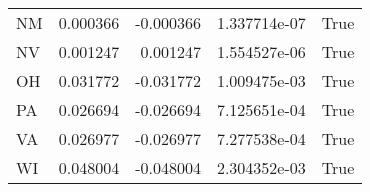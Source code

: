 \begin{table}
\begin{tabular}{lrrrl}
      NM &   0.000366 & -0.000366 &   1.337714e-07 &          True \\
      NV &   0.001247 &  0.001247 &   1.554527e-06 &          True \\
      OH &   0.031772 & -0.031772 &   1.009475e-03 &          True \\
      PA &   0.026694 & -0.026694 &   7.125651e-04 &          True \\
      VA &   0.026977 & -0.026977 &   7.277538e-04 &          True \\
      WI &   0.048004 & -0.048004 &   2.304352e-03 &          True \\
\bottomrule
\end{tabular}
\end{table}
